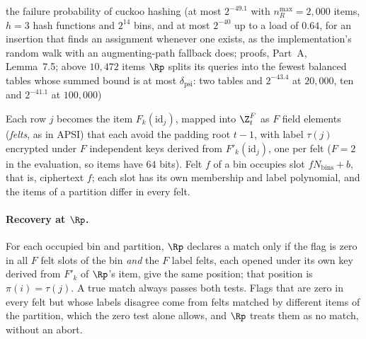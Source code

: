 the failure probability of cuckoo hashing (at most $2^{-49.1}$ with $n_R^{\max} = 2{,}000$ items, $h = 3$ hash functions and $2^{14}$ bins, and at most $2^{-40}$ up to a load of $0.64$, for an insertion that finds an assignment whenever one exists, as the implementation's random walk with an augmenting-path fallback does; proofs, Part~A, Lemma~7.5; above $10{,}472$ items $\Rp$ splits its queries into the fewest balanced tables whose summed bound is at most $\delta_{\mathrm{psi}}$: two tables and $2^{-43.4}$ at $20{,}000$, ten and $2^{-41.1}$ at $100{,}000$)

Each row $j$ becomes the item $F_k(\mathrm{id}_j)$, mapped into $\Z_t^F$ as $F$ field elements (\emph{felts}, as in APSI) that each avoid the padding root $t - 1$, with label $\tau(j)$ encrypted under $F$ independent keys derived from $F'_k(\mathrm{id}_j)$, one per felt ($F = 2$ in the evaluation, so items have $64$ bits). Felt $f$ of a bin occupies slot $f N_{\mathrm{bins}} + b$, that is, ciphertext $f$; each slot has its own membership and label polynomial, and the items of a partition differ in every felt.

\paragraph{Recovery at $\Rp$.} For each occupied bin and partition, $\Rp$ declares a match only if the flag is zero in all $F$ felt slots of the bin \emph{and} the $F$ label felts, each opened under its own key derived from $F'_k$ of $\Rp$'s item, give the same position; that position is $\pi(i) = \tau(j)$. A true match always passes both tests. Flags that are zero in every felt but whose labels disagree come from felts matched by different items of the partition, which the zero test alone allows, and $\Rp$ treats them as no match, without an abort.

